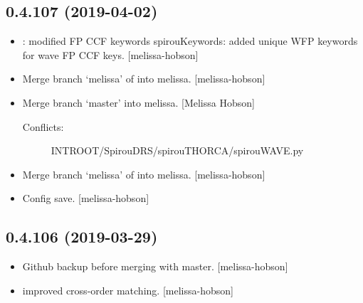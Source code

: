 \documentclass[a4paper,10pt,english]{report}
\begin{document}
\subsection{0.4.107 (2019-04-02)}
\label{\detokenize{misc/changelog:id153}}\begin{itemize}
\item {} 
: modified FP CCF keywords spirouKeywords: added unique
WFP keywords for wave FP CCF keys. {[}melissa-hobson{]}

\item {} 
Merge branch ‘melissa’ of  into
melissa. {[}melissa-hobson{]}

\item {} 
Merge branch ‘master’ into melissa. {[}Melissa Hobson{]}
\begin{description}
\item[{Conflicts:}] \leavevmode
INTROOT/SpirouDRS/spirouTHORCA/spirouWAVE.py

\end{description}

\item {} 
Merge branch ‘melissa’ of  into
melissa. {[}melissa-hobson{]}

\item {} 
Config save. {[}melissa-hobson{]}

\end{itemize}


\subsection{0.4.106 (2019-03-29)}
\label{\detokenize{misc/changelog:id154}}\begin{itemize}
\item {} 
Github backup before merging with master. {[}melissa-hobson{]}

\item {} 
 improved cross-order matching. {[}melissa-hobson{]}

\end{itemize}
\end{document}
